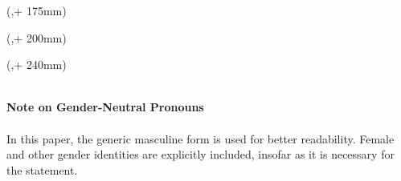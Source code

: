 \begin{textblock*}{\seitenbreite}(\bindekorrektur,\seitenanfang + 175mm)
  \centering\large\sffamily
  \hsmafakultaetlang\\
  \vspace{2mm}
  \hsmakoerperschaft
\end{textblock*}

\begin{textblock*}{\seitenbreite}(\bindekorrektur,\seitenanfang + 200mm)
  \centering\large 
  \textsf{\hsmadatum}
\end{textblock*}


\begin{textblock*}{\seitenbreite}(\bindekorrektur,\seitenanfang + 240mm)
  \centering\large\sffamily
  \hsmatutor \\
  \vspace{2mm}
  \hsmabetreuer\\
  \vspace{2mm}
  \hsmazweitkorrektor
\end{textblock*}

%  
%
%


\clearpage\setcounter{page}{1}
\thispagestyle{empty}
%
\textsf{\large\textbf{Note on Gender-Neutral Pronouns}}
\\
\\
In this paper, the generic masculine form is used for better readability. Female and other gender identities are explicitly included, insofar as it is necessary for the statement.

